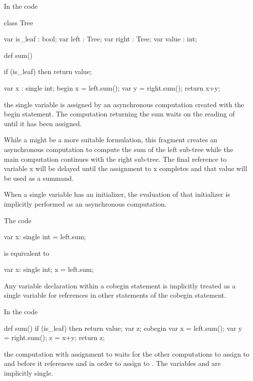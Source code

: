 \begin{example}
In the code
\begin{chapel}
class Tree {
  var is_leaf : bool;
  var left    : Tree;
  var right   : Tree;
  var value   : int;

  def sum() {
    if (is_leaf) then 
       return value;

    var x : single int;
    begin x = left.sum();
    var y = right.sum();
    return x+y;
  }
}
\end{chapel}
the single variable  is assigned by an asynchronous
computation created with the begin statement. The computation
returning the sum waits on the reading of  until it has been
assigned.

While a  might be a more suitable formulation, this
fragment creates an asynchronous computation to compute the sum of the
left sub-tree while the main computation continues with the right
sub-tree. The final reference to variable x will be delayed until the
assignment to x completes and that value will be used as a summand.
\end{example}

When a single variable has an initializer, the evaluation of
that initializer is implicitly performed as an asynchronous computation. 
\begin{example}
The code
\begin{chapel}
var x: single int = left.sum;
\end{chapel}
is equivalent to
\begin{chapel}
var x: single int;
x = left.sum;
\end{chapel}
\end{example}

Any variable declaration within a cobegin statement is implicitly
treated as a single variable for references in other statements of the
cobegin statement.
\begin{example}
In the code
\begin{chapel}
def sum() {
  if (is_leaf) then 
    return value;
  var z;
  cobegin {
    var x = left.sum();
    var y = right.sum();
    z = x+y;
  }
  return z;
}
\end{chapel}
the computation with assignment to  waits for the other
computations to assign to  and  before it
references  and  in order to assign to .  The
variables  and  are implicitly single.
\end{example}

